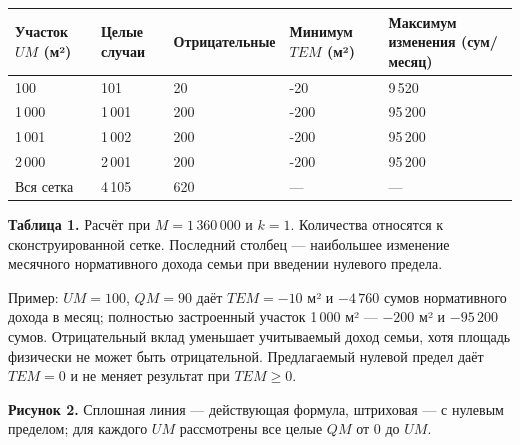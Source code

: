 \documentclass[12pt,a4paper]{extarticle}
\begin{document}
\begingroup\fontsize{11bp}{13.2bp}\selectfont
\begin{longtable}{p{} p{} p{} p{} p{}}
\toprule
Участок $UM$ (м²) & Целые случаи & Отрицательные & Минимум $TEM$ (м²) & Максимум изменения (сум/месяц) \\
\midrule
\endhead
100 & 101 & 20 & -20 & 9\,520 \\
1\,000 & 1\,001 & 200 & -200 & 95\,200 \\
1\,001 & 1\,002 & 200 & -200 & 95\,200 \\
2\,000 & 2\,001 & 200 & -200 & 95\,200 \\
Вся сетка & 4\,105 & 620 & — & — \\
\bottomrule
\end{longtable}
\endgroup
\textbf{Таблица 1.} Расчёт при $M=1\,360\,000$ и $k=1$. Количества относятся к сконструированной сетке. Последний столбец — наибольшее изменение месячного нормативного дохода семьи при введении нулевого предела.

Пример: $UM=100$, $QM=90$ даёт $TEM=-10$ м² и $-4\,760$ сумов нормативного дохода в месяц; полностью застроенный участок 1\,000 м² — $-200$ м² и $-95\,200$ сумов. Отрицательный вклад уменьшает учитываемый доход семьи, хотя площадь физически не может быть отрицательной. Предлагаемый нулевой предел даёт $TEM=0$ и не меняет результат при $TEM\ge0$.

\begin{center}\end{center}
\textbf{Рисунок 2.} Сплошная линия — действующая формула, штриховая — с нулевым пределом; для каждого $UM$ рассмотрены все целые $QM$ от $0$ до $UM$.
\end{document}
